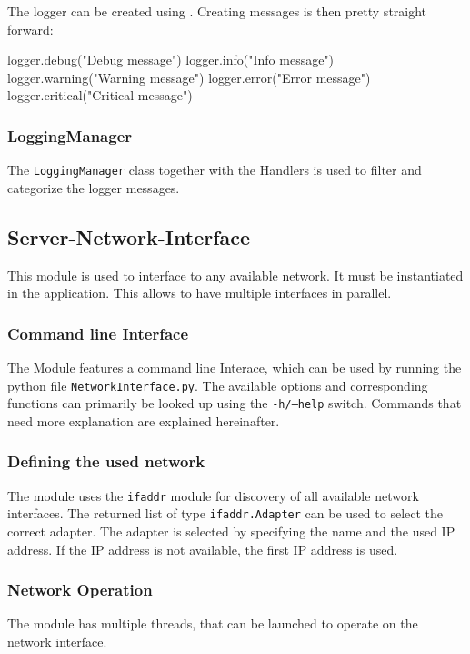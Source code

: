 The logger can be created using . Creating messages is then pretty straight forward: 
\begin{python}
logger.debug("Debug message")
logger.info("Info message")
logger.warning("Warning message")
logger.error("Error message")
logger.critical("Critical message")
\end{python}

\subsubsection{LoggingManager}
The \texttt{LoggingManager} class together with the Handlers is used to filter and categorize the logger messages. 

\subsection{Server-Network-Interface}

This module is used to interface to any available network. It must be instantiated in the application. This allows to have multiple interfaces in parallel.

\subsubsection{Command line Interface}
The Module features a command line Interace, which can be used by running the python file \texttt{NetworkInterface.py}. The available options and corresponding functions can primarily be looked up using the \texttt{-h/--help} switch. Commands that need more explanation are explained hereinafter.  

\subsubsection{Defining the used network}
The module uses the \texttt{ifaddr} module for discovery of all available network interfaces. The returned list of type \texttt{ifaddr.Adapter} can be used to select the correct adapter. The adapter is selected by specifying the name and the used IP address. If the \ac{IP} address is not available, the first \ac{IP} address is used. 

\subsubsection{Network Operation}
The module has multiple threads, that can be launched to operate on the network interface. 

